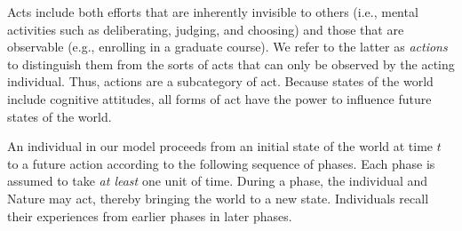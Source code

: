 \documentclass[
11pt,
titlepage,
reqno,
]{article}%
\theoremstyle{definition}
\begin{document}
	Acts include both efforts that are inherently invisible to others (i.e., mental activities such as deliberating, judging, and choosing) and those that are observable (e.g., enrolling in a graduate course).
	We refer to the latter as \textit{actions} to distinguish them from the sorts of acts that can only be observed by the acting individual. 
	Thus, actions are a subcategory of act.
	Because states of the world include cognitive attitudes, all forms of act have the power to influence future states of the world.
	
	An individual in our model proceeds from an initial state of the world at time $t$ to a future action according to the following sequence of phases. 
	Each phase is assumed to take \textit{at least} one unit of time. 
	During a phase, the individual and Nature may act, thereby bringing the world to a new state. Individuals recall their experiences from earlier phases in later phases.
\end{document}
